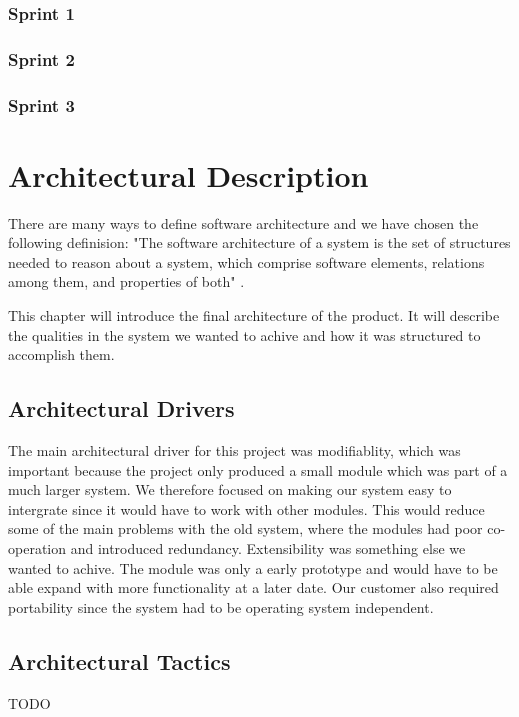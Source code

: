 \documentclass{report}
\begin{document}
\subsection{Sprint 1} \label{subsec:sprint_1}
\subsection{Sprint 2} \label{subsec:sprint_2}
\subsection{Sprint 3} \label{subsec:sprint_3}








\chapter{Architectural Description}
There are many ways to define software architecture and we have chosen the following definision: "The software architecture of a system is the set of structures needed to reason about a system, which comprise software elements, relations among them, and properties of both" \cite[page 4]{Bass2013}.

This chapter will introduce the final architecture of the product. It will describe the qualities in the system we wanted to achive and how it was structured to accomplish them.


\section{Architectural Drivers}
The main architectural driver for this project was modifiablity, which was important because the project only produced a small module which was part of a much larger system. We therefore focused on making our system easy to intergrate since it would have to work with other modules. This would reduce some of the main problems with the old system, where the modules had poor co-operation and introduced redundancy. Extensibility was something else we wanted to achive. The module was only a early prototype and would have to be able expand with more functionality at a later date. Our customer also required portability since the system had to be operating system independent.





\section{Architectural Tactics}
TODO
\end{document}
